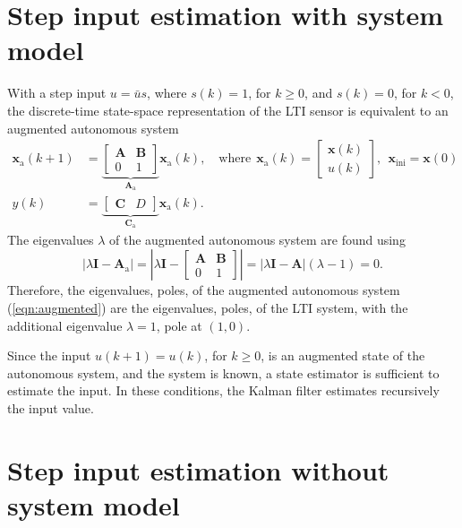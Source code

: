 \section{Step input estimation with system model}

With a step input ${u} = \bar{{u}} s$, where $s(k) = 1$, for $k \geq 0$, and $s(k) = 0$, for $k < 0$, the discrete-time state-space representation of the LTI sensor is equivalent to an augmented autonomous system  
\begin{equation} \begin{aligned} \mathbf{x}_\text{a}(k+1) &= \underbrace{ \begin{bmatrix} \mathbf{A} & \mathbf{B} \\ 0 & 1 \end{bmatrix} }_{\mathbf{A}_\text{a}} \mathbf{x}_\text{a}(k) , \quad \text{where} \ \ \mathbf{x}_\text{a}(k) = \begin{bmatrix} \mathbf{x}(k) \\ {u}(k) \end{bmatrix}, \ \ \mathbf{x}_{\text{ini}} = \mathbf{x}(0) \\
{y}(k) &= \underbrace{ \begin{bmatrix} \mathbf{C} & D \end{bmatrix} }_{\mathbf{C}_\text{a}} \mathbf{x}_\text{a}(k) . \label{eqn:augmented} \end{aligned} \end{equation}
The eigenvalues $\lambda$ of the augmented autonomous system are found using
\[ \left| \lambda \mathbf{I} - \mathbf{A}_\text{a} \right| = \left| \lambda \mathbf{I} - \begin{bmatrix} \mathbf{A} & \mathbf{B} \\ 0 & 1 \end{bmatrix} \right| = \left| \lambda \mathbf{I} - \mathbf{A} \right| \left( \lambda - 1 \right) = 0.\]
Therefore, the eigenvalues, poles, of the augmented autonomous system (\ref{eqn:augmented}) are the eigenvalues, poles, of the LTI system, with the additional eigenvalue $\lambda = 1$, pole at $(1,0)$.  

Since the input ${u}(k+1) = {u}(k)$, for $k \geq 0$, is an augmented state of the autonomous system, and the system is known, a state estimator is sufficient to estimate the input.
In these conditions, the Kalman filter estimates recursively the input value.  

\section{Step input estimation without system model}

